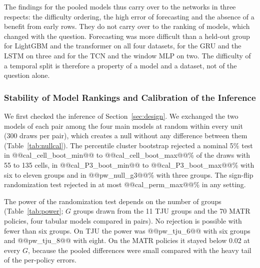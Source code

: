 \documentclass{ieeeaccess}
\newcommand{\fitcol}[1]{\footnotesize\resizebox{\ifdim\width>\columnwidth\columnwidth\else\width\fi}{!}{}}
\newcommand{\fitwide}[1]{\footnotesize\resizebox{\ifdim\width>\textwidth\textwidth\else\width\fi}{!}{}}
\begin{document}
The findings for the pooled models thus carry over to the networks in three respects: the difficulty ordering, the high error of forecasting and the absence of a benefit from early rows. They do not carry over to the ranking of models, which changed with the question. Forecasting was more difficult than a held-out group for LightGBM and the transformer on all four datasets, for the GRU and the LSTM on three and for the TCN and the window MLP on two. The difficulty of a temporal split is therefore a property of a model and a dataset, not of the question alone.

\subsubsection{Stability of Model Rankings and Calibration of the Inference}
\label{sec:res_calib}
\label{sec:res_rank}
\label{sec:res_policy}
We first checked the inference of Section~\ref{sec:design}. We exchanged the two models of each pair among the four main models at random within every unit (300 draws per pair), which creates a null without any difference between them (Table~\ref{tab:nullcal}). The percentile cluster bootstrap rejected a nominal 5\% test in @@cal_cell_boot_min@@ to @@cal_cell_boot_max@@\% of the draws with 55 to 135 cells, in @@cal_P3_boot_min@@ to @@cal_P3_boot_max@@\% with six to eleven groups and in @@pw_null_g3@@\% with three groups. The sign-flip randomization test rejected in at most @@cal_perm_max@@\% in any setting.
\begin{table}[!tb]
\centering
\caption{Rejection rate (\%) of a nominal 5\% test when the two models of a pair are exchanged at random within every unit (mean over the six pairs among ridge regression, LightGBM, GRU and transformer; 300 draws per pair).}
\label{tab:nullcal}
\scriptsize
\fitcol{tables/calibration.tex}
\end{table}

The power of the randomization test depends on the number of groups (Table~\ref{tab:power}; $G$ groups drawn from the 11 TJU groups and the 70 MATR policies, four tabular models compared in pairs). No rejection is possible with fewer than six groups. On TJU the power was @@pw_tju_6@@ with six groups and @@pw_tju_8@@ with eight. On the MATR policies it stayed below 0.02 at every $G$, because the pooled differences were small compared with the heavy tail of the per-policy errors.
\begin{table}[!t]
\centering
\caption{Power and size with $G$ groups drawn from the 11 TJU groups and the 70 MATR policies (mean over six model pairs). Rand.: share of draws with $p<0.05$ and the correct sign in the sign-flip randomization test; boot.: the same for the percentile bootstrap interval; null: rejection rate (\%) of the bootstrap when the two models are exchanged within every group. Smallest $p$: $2^{1-G}$, the lowest two-sided $p$-value that the randomization test can give.}
\label{tab:power}
\scriptsize
\fitwide{tables/power.tex}
\end{table}
\end{document}
